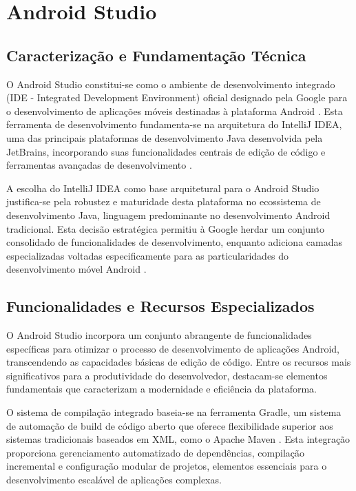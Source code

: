\documentclass[
	12pt,				    %
	openright,			    %
	oneside,			    %
	a4paper,			    %
    sumario=tradicional,    %
	english,			    %
	brazil,				    %
	]{abntex2}              %
\begin{document}
\section{Android Studio}
\subsection{Caracterização e Fundamentação Técnica}

O Android Studio constitui-se como o ambiente de desenvolvimento integrado (IDE - Integrated Development Environment) oficial designado pela Google para o desenvolvimento de aplicações móveis destinadas à plataforma Android \cite{google2023androidstudio}. Esta ferramenta de desenvolvimento fundamenta-se na arquitetura do IntelliJ IDEA, uma das principais plataformas de desenvolvimento Java desenvolvida pela JetBrains, incorporando suas funcionalidades centrais de edição de código e ferramentas avançadas de desenvolvimento \cite{jetbrains2023intellij}.

A escolha do IntelliJ IDEA como base arquitetural para o Android Studio justifica-se pela robustez e maturidade desta plataforma no ecossistema de desenvolvimento Java, linguagem predominante no desenvolvimento Android tradicional. Esta decisão estratégica permitiu à Google herdar um conjunto consolidado de funcionalidades de desenvolvimento, enquanto adiciona camadas especializadas voltadas especificamente para as particularidades do desenvolvimento móvel Android \cite{meier2023android}.

\subsection{Funcionalidades e Recursos Especializados}

O Android Studio incorpora um conjunto abrangente de funcionalidades específicas para otimizar o processo de desenvolvimento de aplicações Android, transcendendo as capacidades básicas de edição de código. Entre os recursos mais significativos para a produtividade do desenvolvedor, destacam-se elementos fundamentais que caracterizam a modernidade e eficiência da plataforma.

O sistema de compilação integrado baseia-se na ferramenta Gradle, um sistema de automação de build de código aberto que oferece flexibilidade superior aos sistemas tradicionais baseados em XML, como o Apache Maven \cite{gradle2023build}. Esta integração proporciona gerenciamento automatizado de dependências, compilação incremental e configuração modular de projetos, elementos essenciais para o desenvolvimento escalável de aplicações complexas.
\end{document}
